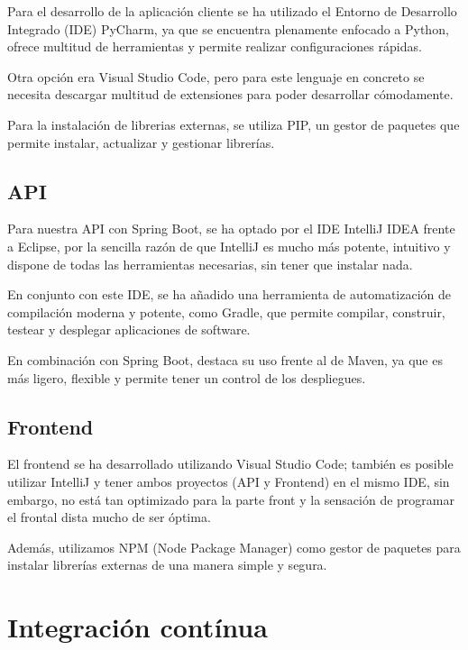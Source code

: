 Para el desarrollo de la aplicación cliente se ha utilizado el Entorno de Desarrollo Integrado (IDE) PyCharm\cite{pycharm:official},
ya que se encuentra plenamente enfocado a Python, ofrece multitud de herramientas y permite realizar configuraciones rápidas.

Otra opción era Visual Studio Code, pero para este lenguaje en concreto se necesita descargar multitud de extensiones
para poder desarrollar cómodamente.

Para la instalación de librerias externas, se utiliza PIP\cite{pip:official}, un gestor de paquetes que permite
instalar, actualizar y gestionar librerías.

\subsection{API}\label{subsec:desarrollo_api}

Para nuestra API con Spring Boot, se ha optado por el IDE IntelliJ IDEA\cite{intellij:official} frente a Eclipse,
por la sencilla razón de que IntelliJ es mucho más potente, intuitivo y dispone de todas las herramientas necesarias,
sin tener que instalar nada.

En conjunto con este IDE, se ha añadido una herramienta de automatización de compilación moderna y potente, como
Gradle\cite{gradle:official}, que permite compilar, construir, testear y desplegar aplicaciones de software.

En combinación con Spring Boot, destaca su uso frente al de Maven, ya que es más ligero, flexible y permite tener un control de
los despliegues.

\subsection{Frontend}\label{subsec:desarrollo_frontend}

El frontend se ha desarrollado utilizando Visual Studio Code\cite{vscode:official}; también es posible utilizar IntelliJ y tener ambos
proyectos (API y Frontend) en el mismo IDE, sin embargo, no está tan optimizado para la parte front y la sensación de
programar el frontal dista mucho de ser óptima.

Además, utilizamos NPM (Node Package Manager)\cite{npm:official} como gestor de paquetes para instalar librerías
externas de una manera simple y segura.

\section{Integración contínua}\label{sec:integracion}

